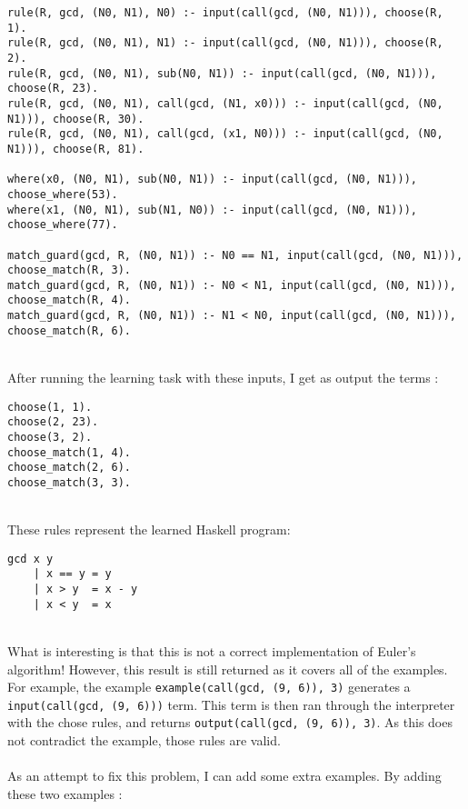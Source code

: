 \begin{lstlisting}
rule(R, gcd, (N0, N1), N0) :- input(call(gcd, (N0, N1))), choose(R, 1).
rule(R, gcd, (N0, N1), N1) :- input(call(gcd, (N0, N1))), choose(R, 2).
rule(R, gcd, (N0, N1), sub(N0, N1)) :- input(call(gcd, (N0, N1))), choose(R, 23).
rule(R, gcd, (N0, N1), call(gcd, (N1, x0))) :- input(call(gcd, (N0, N1))), choose(R, 30).
rule(R, gcd, (N0, N1), call(gcd, (x1, N0))) :- input(call(gcd, (N0, N1))), choose(R, 81).

where(x0, (N0, N1), sub(N0, N1)) :- input(call(gcd, (N0, N1))), choose_where(53).
where(x1, (N0, N1), sub(N1, N0)) :- input(call(gcd, (N0, N1))), choose_where(77).

match_guard(gcd, R, (N0, N1)) :- N0 == N1, input(call(gcd, (N0, N1))), choose_match(R, 3).
match_guard(gcd, R, (N0, N1)) :- N0 < N1, input(call(gcd, (N0, N1))), choose_match(R, 4).
match_guard(gcd, R, (N0, N1)) :- N1 < N0, input(call(gcd, (N0, N1))), choose_match(R, 6).
\end{lstlisting}
\mbox{}\\
After running the learning task with these inputs, I get as output the terms : \\

\begin{multicols}{2}
\begin{lstlisting}
choose(1, 1).
choose(2, 23).
choose(3, 2).
choose_match(1, 4).
choose_match(2, 6).
choose_match(3, 3).
\end{lstlisting}
\end{multicols}
\mbox{}\\
These rules represent the learned Haskell program: \\

\begin{lstlisting}
gcd x y
	| x == y = y
	| x > y  = x - y
	| x < y  = x
\end{lstlisting}
\mbox{}\\
What is interesting is that this is not a correct implementation of Euler's algorithm! However, this result is still returned as it covers all of the examples. For example, the example \lstinline{example(call(gcd, (9, 6)), 3)} generates a \lstinline{input(call(gcd, (9, 6)))} term. This term is then ran through the interpreter with the chose rules, and returns \lstinline{output(call(gcd, (9, 6)), 3)}. As this does not contradict the example, those rules are valid. \\ \\%
As an attempt to fix this problem, I can add some extra examples. By adding these two examples :\\

